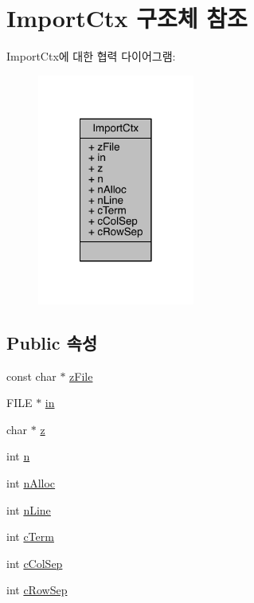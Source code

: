 \hypertarget{struct_import_ctx}{}\section{Import\+Ctx 구조체 참조}
\label{struct_import_ctx}


Import\+Ctx에 대한 협력 다이어그램\+:
\nopagebreak
\begin{figure}[H]
\begin{center}
\leavevmode
\includegraphics[width=146pt]{struct_import_ctx__coll__graph}
\end{center}
\end{figure}
\subsection*{Public 속성}
\begin{DoxyCompactItemize}
\item 
const char $\ast$ \hyperlink{struct_import_ctx_a88414dab6838f62acc8dbb3d2afe299d}{z\+File}
\item 
F\+I\+LE $\ast$ \hyperlink{struct_import_ctx_a63c21cba47680ddd0c842866ab5486e5}{in}
\item 
char $\ast$ \hyperlink{struct_import_ctx_ade5d138b0f146f8bed3e83bfbb450f2e}{z}
\item 
int \hyperlink{struct_import_ctx_a93c89715a8ced4d28b9dcb29a083f748}{n}
\item 
int \hyperlink{struct_import_ctx_a04606938856e8071c34af5c68607734b}{n\+Alloc}
\item 
int \hyperlink{struct_import_ctx_a7b910b2b078d291e84ad333792efb000}{n\+Line}
\item 
int \hyperlink{struct_import_ctx_a32c66d4ff064ed9d5775ec6a0bab66ba}{c\+Term}
\item 
int \hyperlink{struct_import_ctx_a5c5dc07e3bd063d2da26da4a83f46576}{c\+Col\+Sep}
\item 
int \hyperlink{struct_import_ctx_a9b23999b41777a9726b91ec61b74f21a}{c\+Row\+Sep}
\end{DoxyCompactItemize}


